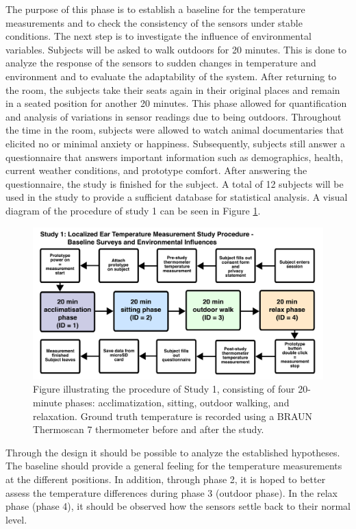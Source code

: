 The purpose of this phase is to establish a baseline for the temperature measurements and to check the consistency of the sensors under stable conditions.
The next step is to investigate the influence of environmental variables. 
Subjects will be asked to walk outdoors for 20 minutes. 
This is done to analyze the response of the sensors to sudden changes in temperature and environment and to evaluate the adaptability of the system.
After returning to the room, the subjects take their seats again in their original places and remain in a seated position for another 20 minutes. 
This phase allowed for quantification and analysis of variations in sensor readings due to being outdoors.
Throughout the time in the room, subjects were allowed to watch animal documentaries that elicited no or minimal anxiety or happiness. 
Subsequently, subjects still answer a questionnaire that answers important information such as demographics, health, current weather conditions, and prototype comfort.
After answering the questionnaire, the study is finished for the subject.
A total of 12 subjects will be used in the study to provide a sufficient database for statistical analysis.
A visual diagram of the procedure of study 1 can be seen in Figure \ref{fig:design:study1:procedure}.

\begin{figure}[t]
    \centering
    \includegraphics[width=\textwidth]{thesis-doc/images/study1/Procedure_new.pdf}
    \caption{Figure illustrating the procedure of Study 1, consisting of four 20-minute phases: acclimatization, sitting, outdoor walking, and relaxation. Ground truth temperature is recorded using a BRAUN Thermoscan 7 thermometer before and after the study.}
    \label{fig:design:study1:procedure}
\end{figure}

Through the design it should be possible to analyze the established hypotheses.
The baseline should provide a general feeling for the temperature measurements at the different positions.
In addition, through phase 2, it is hoped to better assess the temperature differences during phase 3 (outdoor phase).
In the relax phase (phase 4), it should be observed how the sensors settle back to their normal level.

